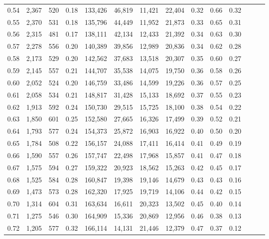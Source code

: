 \begin{tabular}{rrrrrrrrrrrrrr}
0.54 &  2,367 &    520 &  0.18 &  133,426 &   46,819 &  11,421 &  22,404 &  0.32 &  0.66 &      0.32 \\
0.55 &  2,370 &    531 &  0.18 &  135,796 &   44,449 &  11,952 &  21,873 &  0.33 &  0.65 &      0.31 \\
0.56 &  2,315 &    481 &  0.17 &  138,111 &   42,134 &  12,433 &  21,392 &  0.34 &  0.63 &      0.30 \\
0.57 &  2,278 &    556 &  0.20 &  140,389 &   39,856 &  12,989 &  20,836 &  0.34 &  0.62 &      0.28 \\
0.58 &  2,173 &    529 &  0.20 &  142,562 &   37,683 &  13,518 &  20,307 &  0.35 &  0.60 &      0.27 \\
0.59 &  2,145 &    557 &  0.21 &  144,707 &   35,538 &  14,075 &  19,750 &  0.36 &  0.58 &      0.26 \\
0.60 &  2,052 &    524 &  0.20 &  146,759 &   33,486 &  14,599 &  19,226 &  0.36 &  0.57 &      0.25 \\
0.61 &  2,058 &    534 &  0.21 &  148,817 &   31,428 &  15,133 &  18,692 &  0.37 &  0.55 &      0.23 \\
0.62 &  1,913 &    592 &  0.24 &  150,730 &   29,515 &  15,725 &  18,100 &  0.38 &  0.54 &      0.22 \\
0.63 &  1,850 &    601 &  0.25 &  152,580 &   27,665 &  16,326 &  17,499 &  0.39 &  0.52 &      0.21 \\
0.64 &  1,793 &    577 &  0.24 &  154,373 &   25,872 &  16,903 &  16,922 &  0.40 &  0.50 &      0.20 \\
0.65 &  1,784 &    508 &  0.22 &  156,157 &   24,088 &  17,411 &  16,414 &  0.41 &  0.49 &      0.19 \\
0.66 &  1,590 &    557 &  0.26 &  157,747 &   22,498 &  17,968 &  15,857 &  0.41 &  0.47 &      0.18 \\
0.67 &  1,575 &    594 &  0.27 &  159,322 &   20,923 &  18,562 &  15,263 &  0.42 &  0.45 &      0.17 \\
0.68 &  1,525 &    584 &  0.28 &  160,847 &   19,398 &  19,146 &  14,679 &  0.43 &  0.43 &      0.16 \\
0.69 &  1,473 &    573 &  0.28 &  162,320 &   17,925 &  19,719 &  14,106 &  0.44 &  0.42 &      0.15 \\
0.70 &  1,314 &    604 &  0.31 &  163,634 &   16,611 &  20,323 &  13,502 &  0.45 &  0.40 &      0.14 \\
0.71 &  1,275 &    546 &  0.30 &  164,909 &   15,336 &  20,869 &  12,956 &  0.46 &  0.38 &      0.13 \\
0.72 &  1,205 &    577 &  0.32 &  166,114 &   14,131 &  21,446 &  12,379 &  0.47 &  0.37 &      0.12 \\

\end{tabular}
